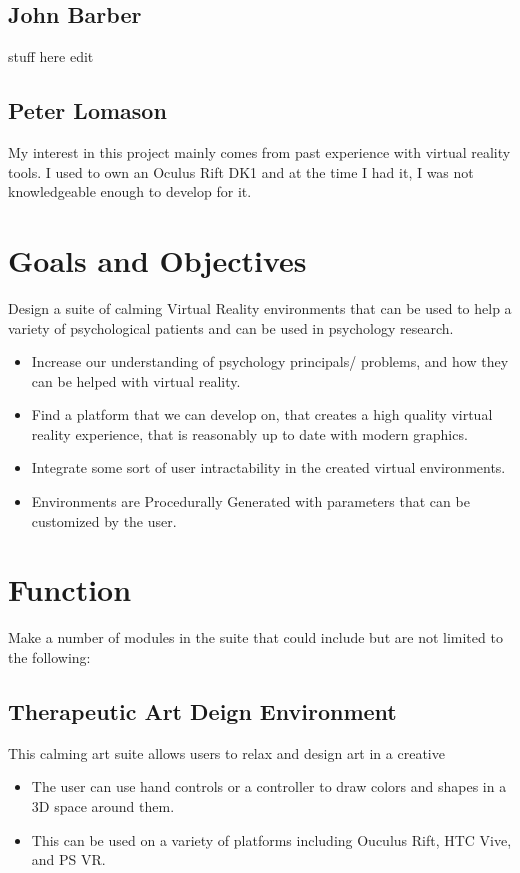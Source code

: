 \documentclass[a4paper,10pt]{article}
\begin{document}
\subsection{John Barber}
stuff here edit
\subsection{Peter Lomason}
My interest in this project mainly comes from past experience with virtual reality tools. I used to own an Oculus Rift DK1 and at the time I had it, I was not knowledgeable enough to develop for it. 
\section{Goals and Objectives}
Design a suite of calming Virtual Reality environments that can be used to help a variety of psychological patients and can be used in psychology research.
\begin{itemize}
    \item Increase our understanding of psychology principals/ problems, and how they can be helped with virtual reality.
    \item Find a platform that we can develop on, that creates a high quality virtual reality experience, that is reasonably up to date with modern graphics.
    \item Integrate some sort of user intractability in the created virtual environments. 
    \item Environments are Procedurally Generated with parameters that can be customized by the user. 
  \end{itemize}

\section{Function}
Make a number of modules in the suite that could include but are not limited to the following:
     \subsection{Therapeutic Art Deign Environment}
     This calming art suite allows users to relax and design art in a creative 
     \begin{itemize}
     \item The user can use hand controls or a controller to draw colors and shapes in a 3D space around them. 
     \item This can be used on a variety of platforms including Ouculus Rift, HTC Vive, and PS VR.
     \end{itemize}   
\end{document}

